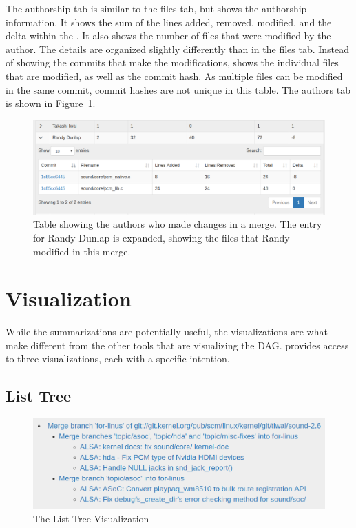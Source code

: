 The authorship tab is similar to the files tab, but shows the authorship
information. It shows the sum of the lines added, removed, modified, and
the delta within the \mt{}. It also shows the number of files that were
modified by the author. The details are organized slightly differently
than in the files tab. Instead of showing the commits that make the
modifications, \tool{} shows the individual files that are modified, as
well as the commit hash. As multiple files can be modified in the same
commit, commit hashes are not unique in this table. The authors tab is
shown in Figure~\ref{fig:linvis_authors_results}.

\begin{figure}[htpb]
  \centering
  \includegraphics[width=0.9\linewidth]{Figures/Linvis/linvis_authors.png}
  \caption{Table showing the authors who made changes in a merge. The
    entry for Randy Dunlap is expanded, showing the files that Randy
    modified in this merge.}
  \label{fig:linvis_authors_results}
\end{figure}

\section{Visualization}\label{sec:visualization}

While the summarizations are potentially useful, the visualizations are
what make \tool{} different from the other tools that are visualizing
the DAG\@. \tool{} provides access to three visualizations, each with a
specific intention.

\subsection{List Tree}\label{sub:list_tree}

\begin{figure}[htpb]
  \centering
  \includegraphics[width=0.9\linewidth]{Figures/Linvis/linvis_list_tree.png}
  \caption{The List Tree Visualization}
  \label{fig:linvis_list_tree}
\end{figure}

